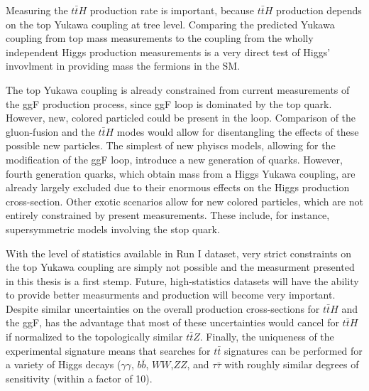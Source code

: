Measuring the $t\bar{t}H$ production rate is important, because
$t\bar{t}H$ production depends on the top Yukawa coupling at tree level. Comparing
the predicted Yukawa coupling from top mass measurements to the coupling from
the wholly independent Higgs production measurements is a very direct 
test of Higgs' invovlment in providing mass the fermions in the SM.

The top Yukawa coupling is already constrained from current measurements of the ggF production
process, since ggF loop is dominated by the top quark. However, new, colored particled could be
present in the loop. Comparison of the gluon-fusion and the $t\bar{t}H$
modes would allow for disentangling the effects of these possible new particles\cite{Dawson:2013bba}. 
The simplest of new phyiscs models, allowing for the modification
of the ggF loop, introduce a new generation of quarks. However, fourth
generation quarks, which obtain mass from a Higgs Yukawa coupling, are already
largely excluded due to their enormous effects on the Higgs production
cross-section\cite{Eberhardt:2012gv}. Other exotic scenarios allow for new colored particles, 
which are not entirely constrained by present measurements\cite{Carena:2013iba,ArkaniHamed:2012kq,Carmi:2012yp}.
These include, for instance, supersymmetric models involving the stop quark.  

With the level of statistics available in Run I dataset, very strict constraints on the top 
Yukawa coupling are simply not possible and the measurment presented in this 
thesis is a first stemp. Future, high-statistics datasets will have the ability to provide 
better measurments and \tth production will become very important.
Despite similar uncertainties on the overall production cross-sections for $t\bar{t}H$ and the ggF,
\tth has the advantage that most of these uncertainties would cancel for $t\bar{t}H$ if normalized to the topologically similar $t\bar{t}Z$.  Finally, the uniqueness of the experimental signature means that
searches for $t\bar{t}$ signatures can be performed for a variety of Higgs decays ($\gamma\gamma$, $b\bar{b}$,
$WW$,$ZZ$, and $\tau\bar{\tau}$ with roughly similar degrees of sensitivity (within a factor of 10)\cite{Dawson:2013bba}. 


